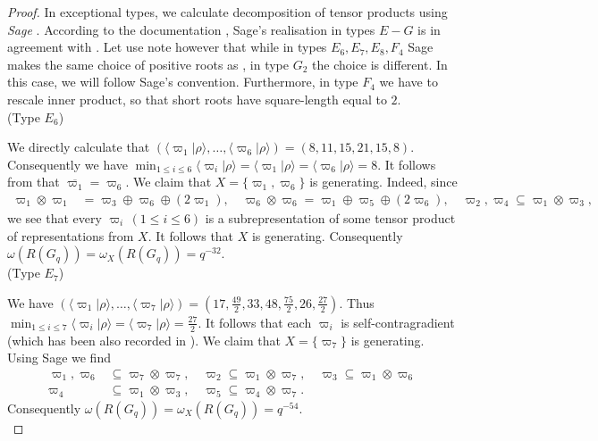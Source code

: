 \documentclass[11 pt, leqno]{amsart}
\newcommand{\ov}{\overline}
\newcommand{\la}{\langle}
\newcommand{\ra}{\rangle}
\theoremstyle{definition}
\numberwithin{equation}{section}
\begin{document}
\begin{proof}
In exceptional types, we calculate decomposition of tensor products using \emph{Sage} \cite{sagemath}. According to the documentation \cite{SageDocumentation}, Sage's realisation in types $E-G$ is in agreement with \cite{BourbakiLie4-6}. Let use note however that while in types $E_6,E_7,E_8,F_4$ Sage makes the same choice of positive roots as \cite{BourbakiLie4-6}, in type $G_2$ the choice is different. In this case, we will follow Sage's convention. Furthermore, in type $F_4$ we have to rescale inner product, so that short roots have square-length equal to $2$.
\\

(Type $E_6$) 

We directly calculate that $(\la \varpi_1|\rho\ra,\dotsc,\la\varpi_6|\rho\ra)=(8,11,15,21,15,8)$. Consequently we have $\min_{1\le i \le 6} \la \varpi_i|\rho\ra =\la \varpi_1|\rho\ra = \la \varpi_6|\rho\ra =8$. It follows from \cite[page 276]{BourbakiLie4-6} that $\ov{\varpi_1}=\varpi_6$. We claim that $X=\{\varpi_1,\varpi_6\}$ is generating. Indeed, since
\[\begin{split}
\varpi_1\otimes \varpi_1&=\varpi_3\oplus \varpi_6 \oplus (2\varpi_1),\quad 
\varpi_6\otimes \varpi_6=\varpi_1\oplus \varpi_5 \oplus (2\varpi_6),\quad 
\varpi_2,\varpi_4\subseteq \varpi_1\otimes \varpi_3,
\end{split}\]
we see that every $\varpi_i\,(1\le i \le 6)$ is a subrepresentation of some tensor product of representations from $X$. It follows that $X$ is generating. Consequently $\omega(R(G_q))=\omega_{X}(R(G_q))=q^{-32}$.\\

(Type $E_7$) 

We have $(\la\varpi_1|\rho\ra,\dotsc,\la\varpi_7|\rho\ra)=(17,\tfrac{49}{2},33,48,\tfrac{75}{2},26,\tfrac{27}{2})$. Thus $\min_{1\le i \le 7}\la \varpi_i|\rho\ra = \la \varpi_7|\rho\ra = \tfrac{27}{2}$. It follows that each $\varpi_i$ is self-contragradient (which has been also recorded in \cite[Page 281]{BourbakiLie4-6}). We claim that $X=\{\varpi_7\}$ is generating.  Using Sage we find
\[\begin{split}
\varpi_1,\varpi_6 &\subseteq \varpi_7\otimes\varpi_7,\quad 
\varpi_2 \subseteq \varpi_1\otimes \varpi_7,\quad 
\varpi_3 \subseteq \varpi_1\otimes \varpi_6\\
\varpi_4&\subseteq \varpi_1\otimes \varpi_3,\quad
\varpi_5 \subseteq \varpi_4\otimes \varpi_7.
\end{split}\]
Consequently $\omega(R(G_q))=\omega_{X}(R(G_q))=q^{-54}$.\\


\end{proof}
\end{document}
